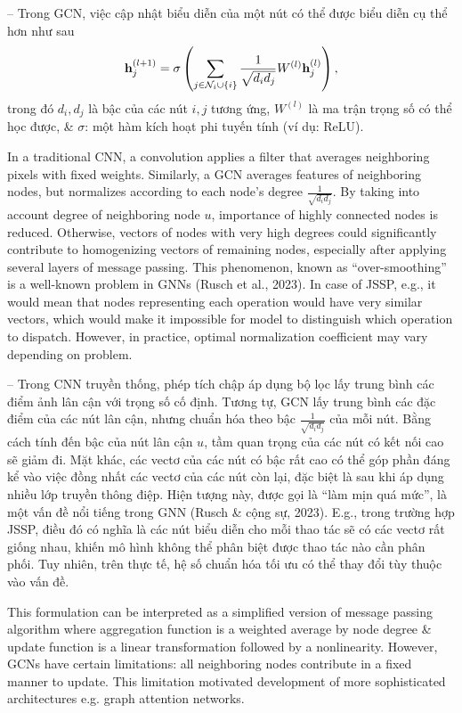 \documentclass{article}
\begin{document}
\begin{itemize}
\begin{itemize}
\begin{itemize}
            -- Trong GCN, việc cập nhật biểu diễn của một nút có thể được biểu diễn cụ thể hơn như sau
            \begin{equation*}
                {\bf h}_j^{(l + 1)} = \sigma\left(\sum_{j\in{\cal N}_i\cup\{i\}} \frac{1}{\sqrt{d_id_j}}W^{(l)}{\bf h}_j^{(l)} \right),
            \end{equation*}
            trong đó $d_i,d_j$ là bậc của các nút $i,j$ tương ứng, $W^{(l)}$ là ma trận trọng số có thể học được, \& $\sigma$: một hàm kích hoạt phi tuyến tính (ví dụ: ReLU).

            In a traditional CNN, a convolution applies a filter that averages neighboring pixels with fixed weights. Similarly, a GCN averages features of neighboring nodes, but normalizes according to each node's degree $\frac{1}{\sqrt{d_id_j}}$. By taking into account degree of neighboring node $u$, importance of highly connected nodes is reduced. Otherwise, vectors of nodes with very high degrees could significantly contribute to homogenizing vectors of remaining nodes, especially after applying several layers of message passing. This phenomenon, known as ``over-smoothing'' is a well-known problem in GNNs (Rusch et al., 2023). In case of JSSP, e.g., it would mean that nodes representing each operation would have very similar vectors, which would make it impossible for model to distinguish which operation to dispatch. However, in practice, optimal normalization coefficient may vary depending on problem.

            -- Trong CNN truyền thống, phép tích chập áp dụng bộ lọc lấy trung bình các điểm ảnh lân cận với trọng số cố định. Tương tự, GCN lấy trung bình các đặc điểm của các nút lân cận, nhưng chuẩn hóa theo bậc $\frac{1}{\sqrt{d_id_j}}$ của mỗi nút. Bằng cách tính đến bậc của nút lân cận $u$, tầm quan trọng của các nút có kết nối cao sẽ giảm đi. Mặt khác, các vectơ của các nút có bậc rất cao có thể góp phần đáng kể vào việc đồng nhất các vectơ của các nút còn lại, đặc biệt là sau khi áp dụng nhiều lớp truyền thông điệp. Hiện tượng này, được gọi là ``làm mịn quá mức'', là một vấn đề nổi tiếng trong GNN (Rusch \& cộng sự, 2023). E.g., trong trường hợp JSSP, điều đó có nghĩa là các nút biểu diễn cho mỗi thao tác sẽ có các vectơ rất giống nhau, khiến mô hình không thể phân biệt được thao tác nào cần phân phối. Tuy nhiên, trên thực tế, hệ số chuẩn hóa tối ưu có thể thay đổi tùy thuộc vào vấn đề.

            This formulation can be interpreted as a simplified version of message passing algorithm where aggregation function is a weighted average by node degree \& update function is a linear transformation followed by a nonlinearity. However, GCNs have certain limitations: all neighboring nodes contribute in a fixed manner to update. This limitation motivated development of more sophisticated architectures e.g. graph attention networks.


\end{itemize}
\end{itemize}
\end{itemize}
\end{document}

